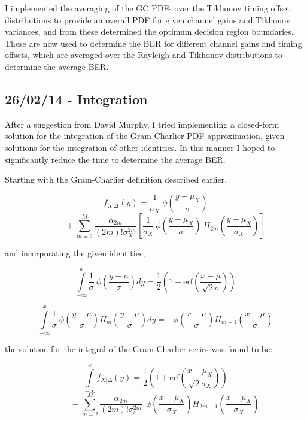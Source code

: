 I implemented the averaging of the GC PDFs over the Tikhonov timing
offset distributions to provide an overall PDF for given channel gains
and Tikhonov variances, and from these determined the optimum decision
region boundaries. These are now used to determine the BER for different
channel gains and timing offsets, which are averaged over the Rayleigh
and Tikhonov distributions to determine the average BER.

\subsection{26/02/14 - Integration}

After a suggestion from David Murphy, I tried implementing a closed-form
solution for the integration of the Gram-Charlier PDF approximation,
given solutions for the integration of other identities. In this manner
I hoped to significantly reduce the time to determine the average BER.

Starting with the Gram-Charlier definition described earlier,

\[
f_{X\vert \Delta}(y) = \frac{1}{\sigma_X} \: \phi \! \left ( \frac{y-\mu_X}{\sigma} \right )
\]
\[
\; \; \; \; \; \; \; \; + \sum \limits_{m=2}^M \frac{\alpha_{2m}}{(2m)! \sigma_X^{2m}} \left [ \frac{1}{\sigma_X} \: \phi \! \left ( \frac{y-\mu_X}{\sigma} \right ) \: H_{2m} \! \left ( \frac{y-\mu_X}{\sigma_X} \right ) \right ]
\]

and incorporating the given identities,

\[
\int \limits_{-\infty}^x \frac{1}{\sigma} \: \phi \! \left ( \frac{y-\mu}{\sigma} \right ) dy =
\frac{1}{2} \left ( 1 + \text{erf} \! \left ( \frac{x-\mu}{\sqrt{2} \sigma} \right ) \right )
\]

\[
\int \limits_{-\infty}^x \frac{1}{\sigma} \: \phi \! \left ( \frac{y-\mu}{\sigma} \right ) H_m \! \left ( \frac{y-\mu}{\sigma} \right ) dy =
- \phi \! \left ( \frac{x-\mu}{\sigma} \right ) H_{m-1} \! \left ( \frac{x-\mu}{\sigma} \right )
\]

the solution for the integral of the Gram-Charlier series was found to
be:

\[
\int \limits_{- \infty}^x f_{X\vert \Delta}(y) = \frac{1}{2} \left ( 1 + \text{erf} \! \left ( \frac{x-\mu_X}{\sqrt{2} \sigma_X} \right ) \right )
\]
\[
\; \; \; \; \; \; \; \;  - \sum \limits_{m=2}^M \frac{\alpha_{2m}}{(2m)! \sigma_x^{2m}} \: \: \phi \! \left ( \frac{x-\mu_X}{\sigma_X} \right ) H_{2m-1} \! \left ( \frac{x-\mu_X}{\sigma_X} \right )
\]

